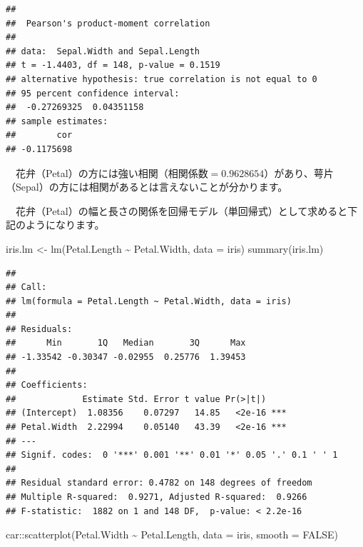 \documentclass[
  12pt,
]{book}
\newenvironment{Shaded}{\begin{snugshade}}{\end{snugshade}}
\newcommand{\AttributeTok}[1]{\textcolor[rgb]{0.77,0.63,0.00}{#1}}
\newcommand{\ConstantTok}[1]{\textcolor[rgb]{0.00,0.00,0.00}{#1}}
\newcommand{\FunctionTok}[1]{\textcolor[rgb]{0.00,0.00,0.00}{#1}}
\newcommand{\NormalTok}[1]{#1}
\newcommand{\OtherTok}[1]{\textcolor[rgb]{0.56,0.35,0.01}{#1}}
\newcommand{\SpecialCharTok}[1]{\textcolor[rgb]{0.00,0.00,0.00}{#1}}
\begin{document}
\begin{verbatim}
## 
##  Pearson's product-moment correlation
## 
## data:  Sepal.Width and Sepal.Length
## t = -1.4403, df = 148, p-value = 0.1519
## alternative hypothesis: true correlation is not equal to 0
## 95 percent confidence interval:
##  -0.27269325  0.04351158
## sample estimates:
##        cor 
## -0.1175698
\end{verbatim}

　花弁（Petal）の方には強い相関（相関係数\(=0.9628654\)）があり、萼片（Sepal）の方には相関があるとは言えないことが分かります。

　花弁（Petal）の幅と長さの関係を回帰モデル（単回帰式）として求めると下記のようになります。

\begin{Shaded}
\begin{Highlighting}[numbers=left,,]
\NormalTok{iris.lm }\OtherTok{\textless{}{-}} \FunctionTok{lm}\NormalTok{(Petal.Length }\SpecialCharTok{\textasciitilde{}}\NormalTok{ Petal.Width, }\AttributeTok{data =}\NormalTok{ iris)}
\FunctionTok{summary}\NormalTok{(iris.lm)}
\end{Highlighting}
\end{Shaded}

\begin{verbatim}
## 
## Call:
## lm(formula = Petal.Length ~ Petal.Width, data = iris)
## 
## Residuals:
##      Min       1Q   Median       3Q      Max 
## -1.33542 -0.30347 -0.02955  0.25776  1.39453 
## 
## Coefficients:
##             Estimate Std. Error t value Pr(>|t|)    
## (Intercept)  1.08356    0.07297   14.85   <2e-16 ***
## Petal.Width  2.22994    0.05140   43.39   <2e-16 ***
## ---
## Signif. codes:  0 '***' 0.001 '**' 0.01 '*' 0.05 '.' 0.1 ' ' 1
## 
## Residual standard error: 0.4782 on 148 degrees of freedom
## Multiple R-squared:  0.9271, Adjusted R-squared:  0.9266 
## F-statistic:  1882 on 1 and 148 DF,  p-value: < 2.2e-16
\end{verbatim}

\begin{Shaded}
\begin{Highlighting}[numbers=left,,]
\NormalTok{car}\SpecialCharTok{::}\FunctionTok{scatterplot}\NormalTok{(Petal.Width }\SpecialCharTok{\textasciitilde{}}\NormalTok{ Petal.Length, }\AttributeTok{data =}\NormalTok{ iris, }\AttributeTok{smooth =} \ConstantTok{FALSE}\NormalTok{)}
\end{Highlighting}
\end{Shaded}
\end{document}
